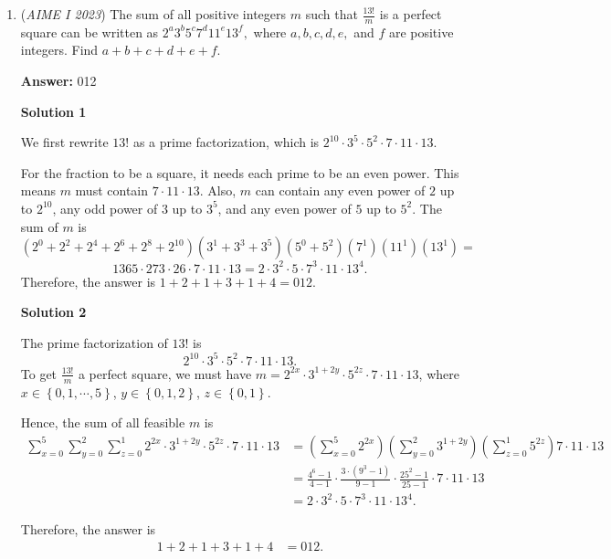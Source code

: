 \begin{enumerate}
 


	\item (\textit{AIME I 2023}) The sum of all positive integers $m$ such that $\frac{13!}{m}$ is a perfect square can be written as $2^a3^b5^c7^d11^e13^f,$ where $a,b,c,d,e,$ and $f$ are positive integers. Find $a+b+c+d+e+f.$

 \textbf{Answer: }012



\textbf{Solution 1}

We first rewrite $13!$ as a prime factorization, which is $2^{10}\cdot3^5\cdot5^2\cdot7\cdot11\cdot13.$

 For the fraction to be a square, it needs each prime to be an even power. This means $m$ must contain $7\cdot11\cdot13$. Also, $m$ can contain any even power of $2$ up to $2^{10}$, any odd power of $3$ up to $3^{5}$, and any even power of $5$ up to $5^{2}$. The sum of $m$ is 
 \[(2^0+2^2+2^4+2^6+2^8+2^{10})(3^1+3^3+3^5)(5^0+5^2)(7^1)(11^1)(13^1) =\] 
 \[1365\cdot273\cdot26\cdot7\cdot11\cdot13 = 2\cdot3^2\cdot5\cdot7^3\cdot11\cdot13^4.\] Therefore, the answer is $1+2+1+3+1+4=\boxed{012}$.

 



\textbf{Solution 2}

The prime factorization of $13!$ is 
 \[2^{10} \cdot 3^5 \cdot 5^2 \cdot 7 \cdot 11 \cdot 13.\]To get $\frac{13!}{m}$ a perfect square, we must have $m = 2^{2x} \cdot 3^{1 + 2y} \cdot 5^{2z} \cdot 7 \cdot 11 \cdot 13$, where $x \in \left\{ 0, 1, \cdots , 5 \right\}$, $y \in \left\{ 0, 1, 2 \right\}$, $z \in \left\{ 0, 1 \right\}$.

 Hence, the sum of all feasible $m$ is
 \begin{align*} \sum_{x=0}^5 \sum_{y=0}^2 \sum_{z=0}^1 2^{2x} \cdot 3^{1 + 2y} \cdot 5^{2z} \cdot 7 \cdot 11 \cdot 13 & = \left( \sum_{x=0}^5 2^{2x} \right) \left( \sum_{y=0}^2 3^{1 + 2y} \right) \left( \sum_{z=0}^1 5^{2z} \right) 7 \cdot 11 \cdot 13 \\ & = \frac{4^6 - 1}{4-1} \cdot \frac{3 \cdot \left( 9^3 - 1 \right)}{9 - 1} \cdot \frac{25^2  - 1}{25 - 1} \cdot 7 \cdot 11 \cdot 13 \\ &  = 2 \cdot 3^2 \cdot 5 \cdot 7^3 \cdot 11 \cdot 13^4 . \end{align*}


 Therefore, the answer is
 \begin{align*} 1 + 2 + 1 + 3 + 1 + 4 & = \boxed{012} . \end{align*}






\end{enumerate}

